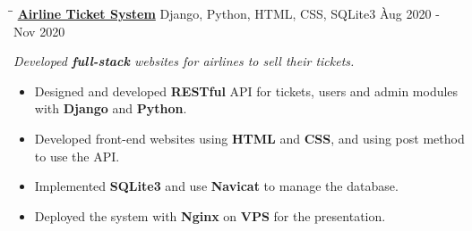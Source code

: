 \documentclass{res}
\begin{document}
\begin{resume}
    \vspace{-0.2in}	 
    \begin{tabbing}
    \hspace{2.391in}\= \hspace{3in}\= \kill %
    \href{https://github.com/DolorHunter/AirlineTicketSystem}{\bf Airline Ticket System}  \> 
                Django, Python, HTML, CSS, SQLite3 \` Aug 2020 - Nov 2020 \\
    \end{tabbing}\vspace{-20pt}      %
    \vspace{-0.13in}
    \textit{Developed {\bf full-stack} websites for airlines to sell their tickets.}
    \vspace{+0.05in}
    \begin{itemize} \itemsep 0.5pt %
        \item Designed and developed {\bf RESTful} API for tickets, users and admin modules with 
                {\bf Django} and {\bf Python}.
        \item Developed front-end websites using {\bf HTML} and {\bf CSS}, and using post method 
                to use the API.
        \item Implemented {\bf SQLite3} and use {\bf Navicat} to manage the database.
        \item Deployed the system with {\bf Nginx} on {\bf VPS} for the presentation.
    \end{itemize}


\end{resume}
\end{document}
